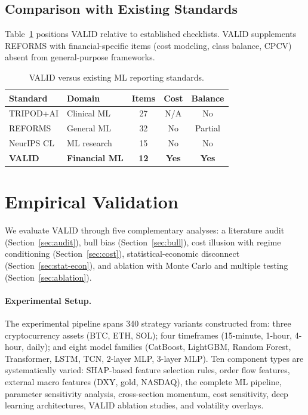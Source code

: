 \documentclass[sigconf,anonymous,review]{acmart}
\begin{document}
\subsection{Comparison with Existing Standards}

Table~\ref{tab:standards} positions VALID relative to established
checklists. VALID supplements REFORMS with financial-specific items
(cost modeling, class balance, CPCV) absent from general-purpose
frameworks.

\begin{table}[t]
\centering
\caption{VALID versus existing ML reporting standards.}
\label{tab:standards}
\small
\begin{tabular}{llccc}
\toprule
Standard & Domain & Items & Cost & Balance \\
\midrule
TRIPOD+AI & Clinical ML & 27 & N/A & No \\
REFORMS & General ML & 32 & No & Partial \\
NeurIPS CL & ML research & 15 & No & No \\
\textbf{VALID} & \textbf{Financial ML} & \textbf{12} & \textbf{Yes} & \textbf{Yes} \\
\bottomrule
\end{tabular}
\end{table}


\section{Empirical Validation}
\label{sec:empirical}

We evaluate VALID through five complementary analyses: a literature
audit (Section~\ref{sec:audit}), bull bias (Section~\ref{sec:bull}),
cost illusion with regime conditioning (Section~\ref{sec:cost}),
statistical-economic disconnect (Section~\ref{sec:stat-econ}), and
ablation with Monte Carlo and multiple testing
(Section~\ref{sec:ablation}).

\paragraph{Experimental Setup.}
The experimental pipeline spans 340 strategy variants constructed
from: three cryptocurrency assets (BTC, ETH, SOL); four timeframes
(15-minute, 1-hour, 4-hour, daily); and eight model families
(CatBoost, LightGBM, Random Forest, Transformer, LSTM, TCN,
2-layer MLP, 3-layer MLP). Ten component types are systematically
varied: SHAP-based feature selection rules, order flow features,
external macro features (DXY, gold, NASDAQ), the complete ML
pipeline, parameter sensitivity analysis, cross-section momentum,
cost sensitivity, deep learning architectures, VALID ablation
studies, and volatility overlays.
\end{document}
